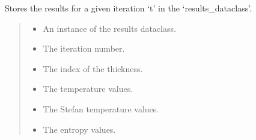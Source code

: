 \documentclass[a4paper,11pt,english,openany]{sphinxmanual}
\begin{document}
\begin{fulllineitems}
\begin{fulllineitems}
\label{\detokenize{api/spyice.parameters.results_params:spyice.parameters.results_params.ResultsParams.store_results_for_iter_t}}
\pysigstartsignatures
{}
\pysigstopsignatures
\sphinxAtStartPar
Stores the results for a given iteration ‘t’ in the ‘results\_dataclass’.
\begin{quote}\begin{description}
\begin{itemize}
\item {} 
\sphinxAtStartPar
{} \textendash{} An instance of the results dataclass.

\item {} 
\sphinxAtStartPar
{} \textendash{} The iteration number.

\item {} 
\sphinxAtStartPar
{} \textendash{} The index of the thickness.

\item {} 
\sphinxAtStartPar
{} \textendash{} The temperature values.

\item {} 
\sphinxAtStartPar
{} \textendash{} The Stefan temperature values.

\item {} 
\sphinxAtStartPar
{} \textendash{} The entropy values.


\end{itemize}
\end{description}
\end{quote}
\end{fulllineitems}
\end{fulllineitems}
\end{document}
